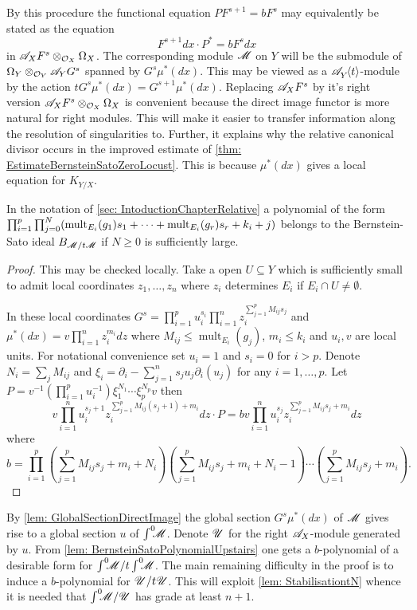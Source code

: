 By this procedure the functional equation $P F^{s+1} = b F^s$ may equivalently be stated as the equation
$$F^{s+1}dx \cdot P^* = b F^s dx $$
in $\mathscr{A}_X F^s \otimes_{\mathcal{O}_X}\Omega_X$.
The corresponding module $\mathscr{M}$ on $Y$ will be the submodule of $\Omega_Y\otimes_{\mathcal{O}_Y} \mathscr{A}_Y G^s$ spanned by $G^s \mu^*(dx)$.
This may be viewed as a $\mathscr{A}_{Y}^{}\mkern-5mu\left\langle t \right\rangle$-module by the action $t G^s \mu^*(dx) = G^{s+1} \mu^*(dx)$.
Replacing $\mathscr{A}_XF^s$ by it's right version $\mathscr{A}_XF^s \otimes_{\mathcal{O}_X}\Omega_X$ is convenient because the direct image functor is more natural for right modules.
This will make it easier to transfer information along the resolution of singularities to.
Further, it explains why the relative canonical divisor occurs in the improved estimate of \cref{thm: EstimateBernsteinSatoZeroLocust}.
This is because $\mu^*(dx)$ gives a local equation for $K_{Y/X}$.
\begin{lemma}\label{lem: BernsteinSatoPolynomialUpstairs}
  In the notation of \cref{sec: IntoductionChapterRelative} a polynomial of the form
  $\prod_{i=1}^p \prod_{j=0}^N(\operatorname{mult}_{E_i}(g_1)\allowbreak s_1 + \cdots + \operatorname{mult}_{E_i}(g_r)\allowbreak s_r + k_i + j)$
  belongs to the Bernstein-Sato ideal $B_{\mathscr{M}/t\mathscr{M}}$ if $N\geq 0$ is sufficiently large.
\end{lemma}
\begin{proof}
  This may be checked locally.
  Take a open $U\subseteq Y$ which is sufficiently small to admit local coordinates $z_1,\ldots,z_n$ where $z_i$ determines $E_i$ if $E_i\cap U \neq \emptyset$.

  In these local coordinates $G^s = \prod_{i=1}^p u_i^{s_i} \prod_{i=1}^nz_i^{\sum_{j=1}^p M_{ij}s_j}$ and $\mu^*(dx) = v \prod_{i=1}^n z_i^{m_i} dz$ where $M_{ij} \leq \operatorname{mult}_{E_i}(g_j)$, $m_i \leq k_i$ and $u_i,v$ are local units.
  For notational convenience set $u_i=1$ and $s_i=0$ for $i>p$.
  Denote $N_i = \sum_j M_{ij}$ and $\xi_i = \partial_i - \sum_{j=1}^n s_ju_j \partial_i(u_j)$ for any $i=1,\ldots,p$.
  Let $P = v^{-1}(\prod_{i=1}^p u_i^{-1})\xi_1^{N_1} \cdots \xi_p^{N_p} v$ then
  $$v\prod_{i=1}^n u_i^{s_j + 1}z_i^{\sum_{j=1}^p M_{ij}(s_j+1) + m_i}dz \cdot P =  b v \prod_{i=1}^nu_i^{s_j}z_i^{\sum_{j=1}^p M_{ij}s_j + m_i}dz $$
  where
  $$b = \prod_{i=1}^p(\sum_{j=1}^p M_{ij}s_j + m_i + N_i)(\sum_{j=1}^p M_{ij}s_j + m_i + N_i - 1)\cdots(\sum_{j=1}^p M_{ij}s_j + m_i).$$
\end{proof}

By \cref{lem: GlobalSectionDirectImage} the global section $G^s \mu^*(dx)$ of $\mathscr{M}$ gives rise to a global section $u$ of $\int^0 \mkern -8mu\mathscr{M}$.
Denote $\mathscr{U}$ for the right $\mathscr{A}_X$-module generated by $u$.
From \cref{lem: BernsteinSatoPolynomialUpstairs} one gets a $b$-polynomial of a desirable form for $\int^0 \mkern -8mu \mathscr{M}/t\int^0 \mkern -8mu\mathscr{M}$.
The main remaining difficulty in the proof is to induce a $b$-polynomial for $\mathscr{U}/t\mathscr{U}$.
This will exploit \cref{lem: StabilisationtN} whence it is needed that $\int^0 \mkern -8mu\mathscr{M} /\mathscr{U}$ has grade at least $n+1$.

